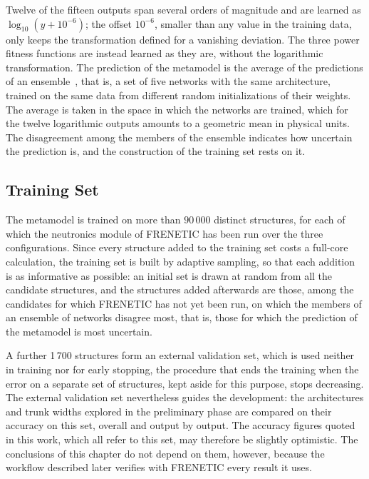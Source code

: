 Twelve of the fifteen outputs span several orders of magnitude and are learned
as $\log_{10}(y+10^{-6})$; the offset $10^{-6}$, smaller than any value in the
training data, only keeps the transformation defined for a vanishing deviation.
The three power fitness functions are instead learned as they are, without the
logarithmic transformation. The prediction of the metamodel is the average of
the predictions of an ensemble~\cite{deepEnsembles}, that is, a set of five
networks with the same architecture, trained on the same data from different
random initializations of their weights. The average is taken in the space in
which the networks are trained, which for the twelve logarithmic outputs
amounts to a geometric mean in physical units. The disagreement among the
members of the ensemble indicates how uncertain the prediction is, and the
construction of the training set rests on it.

\subsection{Training Set}

The metamodel is trained on more than $90\,000$ distinct structures, for each of
which the neutronics module of FRENETIC has been run over the three
configurations. Since every structure added to the training set costs a
full-core calculation, the training set is built by adaptive sampling, so that
each addition is as informative as possible: an initial set is drawn at random
from all the candidate structures, and the structures added afterwards are
those, among the candidates for which FRENETIC has not yet been run, on which
the members of an ensemble of networks disagree most, that is, those for which
the prediction of the metamodel is most uncertain.

A further 1\,700 structures form an external validation set, which is used
neither in training nor for early stopping, the procedure that ends the
training when the error on a separate set of structures, kept aside for this
purpose, stops decreasing. The external validation set nevertheless guides the
development: the architectures and trunk widths explored in the preliminary
phase are compared on their accuracy on this set, overall and output by output.
The accuracy figures quoted in this work, which all refer to this set, may
therefore be slightly optimistic. The conclusions of this chapter do not depend
on them, however, because the workflow described later verifies with FRENETIC
every result it uses.

